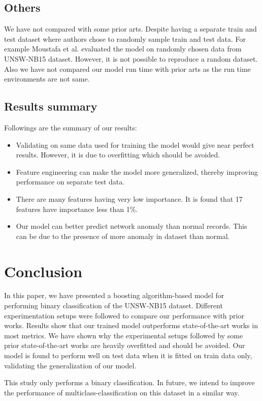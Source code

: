 \documentclass[14pt, conference]{IEEEtran}
\begin{document}
\subsection{Others}
We have not compared with some prior arts. Despite having a separate train and test dataset where authors chose to
randomly sample train and test data. For example Moustafa et al. \cite{moustafa2017hybrid} \cite{moustafa2018anomaly} \cite{moustafa2019holistic}
evaluated the model on randomly chosen data from UNSW-NB15 dataset. However, it is not possible to reproduce a random dataset. Also we have not compared our model run time with prior arts as the run time environments are not same.



\subsection{Results summary}

Followings are the summary of our results:
\begin{itemize}
    \item Validating on same data used for training the model would give near perfect results. However, it is due to overfitting which should be avoided.
    \item Feature engineering can make the model more generalized, thereby improving performance on separate test data.
    \item There are many features having very low importance. It is found that 17 features have importance less than 1\%.
    \item Our model can better predict network anomaly than normal records. This can be due to the presence of more anomaly in dataset than normal.
\end{itemize}

\section{Conclusion \label{conclusion}}
In this paper, we have presented a boosting algorithm-based model for performing binary classification of the UNSW-NB15 dataset.
Different experimentation setups were followed to compare our performance with prior works. Results show that our trained model outperforms state-of-the-art works in most metrics. We have  shown why the experimental setups followed by
some prior state-of-the-art works are heavily overfitted and should be avoided. Our model is found to perform well on test data when
it is fitted on train data only, validating the generalization of our model.

This study only performs a binary classification. In  future, we intend to improve  the performance of multiclass-classification on this dataset in a similar way.



\end{document}

